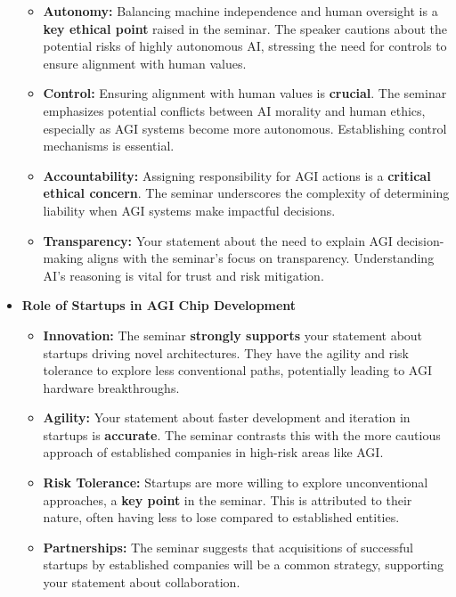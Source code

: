 \documentclass[
]{article}
\begin{document}
\begin{itemize}
  \begin{itemize}
  
  \item
    \textbf{Autonomy:} Balancing machine independence and human
    oversight is a \textbf{key ethical point} raised in the seminar. The
    speaker cautions about the potential risks of highly autonomous AI,
    stressing the need for controls to ensure alignment with human
    values.
  \item
    \textbf{Control:} Ensuring alignment with human values is
    \textbf{crucial}. The seminar emphasizes potential conflicts between
    AI morality and human ethics, especially as AGI systems become more
    autonomous. Establishing control mechanisms is essential.
  \item
    \textbf{Accountability:} Assigning responsibility for AGI actions is
    a \textbf{critical ethical concern}. The seminar underscores the
    complexity of determining liability when AGI systems make impactful
    decisions.
  \item
    \textbf{Transparency:} Your statement about the need to explain AGI
    decision-making aligns with the seminar's focus on transparency.
    Understanding AI's reasoning is vital for trust and risk mitigation.
  \end{itemize}
\item
  \textbf{Role of Startups in AGI Chip Development}

  \begin{itemize}
  
  \item
    \textbf{Innovation:} The seminar \textbf{strongly supports} your
    statement about startups driving novel architectures. They have the
    agility and risk tolerance to explore less conventional paths,
    potentially leading to AGI hardware breakthroughs.
  \item
    \textbf{Agility:} Your statement about faster development and
    iteration in startups is \textbf{accurate}. The seminar contrasts
    this with the more cautious approach of established companies in
    high-risk areas like AGI.
  \item
    \textbf{Risk Tolerance:} Startups are more willing to explore
    unconventional approaches, a \textbf{key point} in the seminar. This
    is attributed to their nature, often having less to lose compared to
    established entities.
  \item
    \textbf{Partnerships:} The seminar suggests that acquisitions of
    successful startups by established companies will be a common
    strategy, supporting your statement about collaboration.
  \end{itemize}
\end{itemize}
\end{document}
